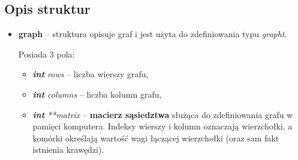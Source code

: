 \documentclass{article}
\begin{document}
\subsection{Opis struktur}
\begin{itemize}
    \item \textbf{graph} -- struktura opisuje graf i jest użyta do zdefiniowania typu \emph{graph\textunderscore t}.
    
    
    Posiada 3 pola:
    \begin{itemize}
        \item \textit{\textbf{int} rows} -- liczba wierszy grafu,
        \item \textit{\textbf{int} columns} -- liczba kolumn grafu,
        \item \textit{\textbf{int} **matrix} -- \textbf{macierz sąsiedztwa} służąca do zdefiniowania grafu w pamięci komputera. Indeksy wierszy i kolumn oznaczają wierzchołki, a komórki określają wartość wagi łączącej wierzchołki (oraz sam fakt istnienia krawędzi).
    \end{itemize}
\end{itemize}

\newpage
\end{document}

